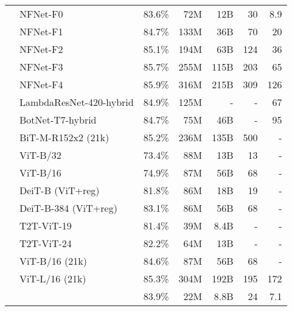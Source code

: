 \documentclass{article}
\begin{document}
\begin{table*}
{\begin{tabular}{cl||rrrrr}
          &NFNet-F0 \cite{nfnet21}              &   83.6\%  &     72M   &   12B   &     30    & 8.9    \\ 
          &NFNet-F1 \cite{nfnet21}              &   84.7\%  &    133M   &   36B   &     70    & 20    \\ 
          &NFNet-F2 \cite{nfnet21}              &   85.1\%  &    194M   &   63B   &    124    & 36    \\ 
          &NFNet-F3 \cite{nfnet21}              &   85.7\%  &    255M   &  115B   &    203    & 65    \\ 
          &NFNet-F4 \cite{nfnet21}              &   85.9\%  &    316M   &  215B   &    309    & 126   \\ 
&LambdaResNet-420-hybrid \cite{lambdanet21}& 84.9\% &   125M       &    -    &    -      & 67  \\
&BotNet-T7-hybrid \cite{botnet21}            &  84.7\%   &   75M     &   46B   &    -      & 95  \\
&BiT-M-R152x2 (21k)  \cite{bit20}     &   85.2\%  &    236M   &  135B   &    500    &  -   \\
        \midrule
          &ViT-B/32 \cite{vit21}                &   73.4\%  &     88M   &   13B   &     13    & -    \\
          &ViT-B/16  \cite{vit21}               &   74.9\%  &     87M   &   56B   &     68    & -    \\
&DeiT-B (ViT+reg)  \cite{deit21}               &   81.8\%  &     86M   &   18B   &     19    & -    \\
          &DeiT-B-384  (ViT+reg) \cite{deit21}            &   83.1\%  &     86M   &   56B   &    68    & -    \\
&T2T-ViT-19  \cite{t2tvit21}               &   81.4\%  &     39M  &   8.4B   &     -    & -    \\
          &T2T-ViT-24  \cite{t2tvit21}               &   82.2\%  &     64M   &   13B   &     -    & -    \\
&ViT-B/16 (21k) \cite{vit21}          &   84.6\%  &    87M   &  56B   &    68   &  - \\
          &ViT-L/16 (21k) \cite{vit21}          &   85.3\%  &    304M   &  192B   &    195   &  172 \\
        \midrule
&                             &   83.9\%  &    22M    &   8.8B    &    24    &  7.1 \\

\end{tabular}}
\end{table*}
\end{document}
